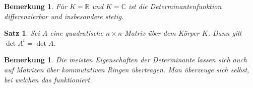 \documentclass[12pt,a4paper]{article}
\theoremstyle{plain}
\newtheorem{Satz}[Theorem]{Satz}
\newtheorem{Bemerkung}[Theorem]{Bemerkung}
\numberwithin{equation}{section}
\begin{document}
\begin{Bemerkung}
Für $K=\mathbb R$ und $K=\mathbb C$ ist die Determinantenfunktion differenzierbar und insbesondere stetig.
\end{Bemerkung}
\begin{Satz}
Sei $A$ eine quadratische $n\times n$-Matrix über dem Körper $K$. Dann gilt $\det A^t=\det A$.
\end{Satz}
\begin{Bemerkung}
Die meisten Eigenschaften der Determinante lassen sich auch auf Matrizen über kommutativen Ringen übertragen. Man überzeuge sich selbst, bei welchen das funktioniert.
\end{Bemerkung}
\end{document}
